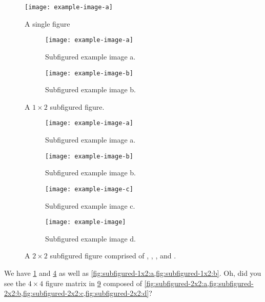 \Blinddocument

\begin{figure}
  \centering
  \smaller[1]
  \texttt{[image: example-image-a]}
  \caption{%
    A single figure
  }
  \label{fig:single-figure}
\end{figure}

\begin{figure}
  \centering
  \smaller[1]
  \begin{subfigure}[t]{0.49\linewidth}
    \centering
    \texttt{[image: example-image-a]}
    \caption{%
      Subfigured example image a.
    }
    \label{fig:subfigured-1x2:a}
  \end{subfigure}%
  \hfill%
  \begin{subfigure}[t]{0.49\linewidth}
    \centering
    \texttt{[image: example-image-b]}
    \caption{%
      Subfigured example image b.
    }
    \label{fig:subfigured-1x2:b}
  \end{subfigure}%
  \caption{%
    A $1 \times 2$ subfigured figure.
  }
  \label{fig:subfigured-1x2}
\end{figure}

\begin{figure}
  \centering
  \smaller[1]
  \begin{subfigure}[t]{0.49\linewidth}
    \centering
    \texttt{[image: example-image-a]}
    \caption{%
      Subfigured example image a.
    }
    \label{fig:subfigured-2x2:a}
  \end{subfigure}%
  \hfill%
  \begin{subfigure}[t]{0.49\linewidth}
    \centering
    \texttt{[image: example-image-b]}
    \caption{%
      Subfigured example image b.
    }
    \label{fig:subfigured-2x2:b}
  \end{subfigure}%
  \hfill%
  \begin{subfigure}[t]{0.49\linewidth}
    \centering
    \texttt{[image: example-image-c]}
    \caption{%
      Subfigured example image c.
    }
    \label{fig:subfigured-2x2:c}
  \end{subfigure}%
  \hfill%
  \begin{subfigure}[t]{0.49\linewidth}
    \centering
    \texttt{[image: example-image]}
    \caption{%
      Subfigured example image d.
    }
    \label{fig:subfigured-2x2:d}
  \end{subfigure}%
  \caption{%
    A $2 \times 2$ subfigured figure comprised of , , , and .
  }
  \label{fig:subfigured-2x2}
\end{figure}

We have \cref{fig:single-figure} and \cref{fig:subfigured-1x2} as well as \cref{fig:subfigured-1x2:a,fig:subfigured-1x2:b}.
Oh, did you see the $4 \times 4$ figure matrix in \cref{fig:subfigured-2x2} composed of \cref{fig:subfigured-2x2:a,fig:subfigured-2x2:b,fig:subfigured-2x2:c,fig:subfigured-2x2:d}?

\Blinddocument
